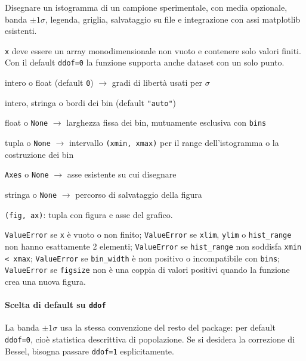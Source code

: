 \begin{apidesc}
  \item[\textbf{Scopo}]
    Disegnare un istogramma di un campione sperimentale, con media opzionale, banda \(\pm 1\sigma\), legenda, griglia, salvataggio su file e integrazione con assi matplotlib esistenti.
  \item[\textbf{Contratto sugli input}]
    \texttt{x} deve essere un array monodimensionale non vuoto e contenere solo valori finiti. Con il default \texttt{ddof=0} la funzione supporta anche dataset con un solo punto.
  \item[\textbf{Parametri chiave}]\hfill
    \begin{description}[font=\normalfont\ttfamily\bfseries, labelwidth=8em, leftmargin=8.5em, itemsep=1pt, parsep=0pt, topsep=2pt]
      \item[ddof] intero o float (default \texttt{0}) $\to$ gradi di libertà usati per \(\sigma\)
      \item[bins] intero, stringa o bordi dei bin (default \texttt{"auto"})
      \item[bin\_width] float o \texttt{None} $\to$ larghezza fissa dei bin, mutuamente esclusiva con \texttt{bins}
      \item[hist\_range] tupla o \texttt{None} $\to$ intervallo \texttt{(xmin, xmax)} per il range dell'istogramma o la costruzione dei bin
      \item[ax] \texttt{Axes} o \texttt{None} $\to$ asse esistente su cui disegnare
      \item[save\_path] stringa o \texttt{None} $\to$ percorso di salvataggio della figura
    \end{description}
  \item[\textbf{Restituisce}]
    \texttt{(fig, ax)}: tupla con figura e asse del grafico.
  \item[\textbf{Eccezioni}]
    \texttt{ValueError} se \texttt{x} è vuoto o non finito;
    \texttt{ValueError} se \texttt{xlim}, \texttt{ylim} o \texttt{hist\_range} non hanno esattamente 2 elementi;
    \texttt{ValueError} se \texttt{hist\_range} non soddisfa \texttt{xmin < xmax};
    \texttt{ValueError} se \texttt{bin\_width} è non positivo o incompatibile con \texttt{bins};
    \texttt{ValueError} se \texttt{figsize} non è una coppia di valori positivi quando la funzione crea una nuova figura.
\end{apidesc}

\paragraph{Scelta di default su \texttt{ddof}}
La banda \(\pm 1\sigma\) usa la stessa convenzione del resto del package: per default \texttt{ddof=0}, cioè statistica descrittiva di popolazione. Se si desidera la correzione di Bessel, bisogna passare \texttt{ddof=1} esplicitamente.

